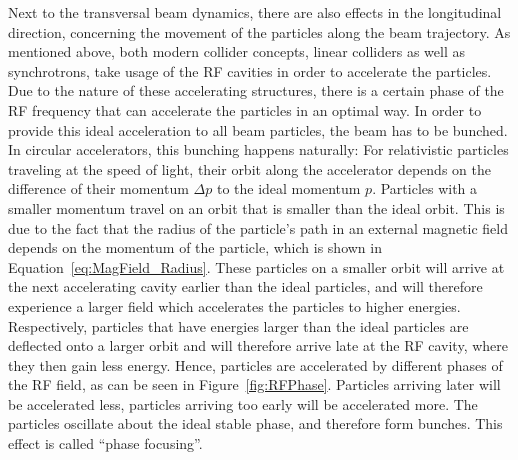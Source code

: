 Next to the transversal beam dynamics, there are also effects in the longitudinal direction, concerning the movement of the particles along the beam trajectory.
As mentioned above, both modern collider concepts, linear colliders as well as synchrotrons, take usage of the RF cavities in order to accelerate the particles.
Due to the nature of these accelerating structures, there is a certain phase of the RF frequency that can accelerate the particles in an optimal way.
In order to provide this ideal acceleration to all beam particles, the beam has to be bunched.\\
In circular accelerators, this bunching happens naturally:
For relativistic particles traveling at the speed of light, their orbit along the accelerator depends on the difference of their momentum $\Delta p$ to the ideal momentum $p$.
Particles with a smaller momentum travel on an orbit that is smaller than the ideal orbit.
This is due to the fact that the radius of the particle's path in an external magnetic field depends on the momentum of the particle, which is shown in Equation~\ref{eq:MagField_Radius}.
These particles on a smaller orbit will arrive at the next accelerating cavity earlier than the ideal particles, and will therefore experience a larger field which accelerates the particles to higher energies.
Respectively, particles that have energies larger than the ideal particles are deflected onto a larger orbit and will therefore arrive late at the RF cavity, where they then gain less energy. 
Hence, particles are accelerated by different phases of the RF field, as can be seen in Figure~\ref{fig:RFPhase}.
Particles arriving later will be accelerated less, particles arriving too early will be accelerated more.
The particles oscillate about the ideal stable phase, and therefore form bunches.
This effect is called ``phase focusing''.
